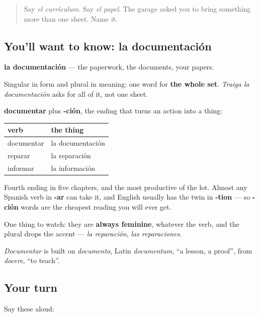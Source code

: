 \label{lesson:ES-C435-documentacion}



\begin{quote}
Say \emph{el currículum}. Say \emph{el papel}. The garage asked you to bring something more than one sheet. Name it.
\end{quote}

\subsection*{You'll want to know: la documentación}
\textbf{la documentación} — the paperwork, the documents, your papers.

Singular in form and plural in meaning: one word for \textbf{the whole set}. \emph{Traiga la documentación} asks for all of it, not one sheet.

\begin{cousinweb}
\textbf{documentar} plus \textbf{-ción}, the ending that turns an action into a thing:

\noindent
\begin{tabularx}{\linewidth}{@{}>{\raggedright\arraybackslash}X>{\raggedright\arraybackslash}X@{}}
\toprule
\textbf{verb} & \textbf{the thing} \\
\midrule
documentar & la documentación \\
reparar & la reparación \\
informar & la información \\
\bottomrule
\end{tabularx}

Fourth ending in five chapters, and the most productive of the lot. Almost any Spanish verb in \textbf{-ar} can take it, and English usually has the twin in \textbf{-tion} — so \textbf{-ción} words are the cheapest reading you will ever get.

One thing to watch: they are \textbf{always feminine}, whatever the verb, and the plural drops the accent — \emph{la reparación}, \emph{las reparaciones}.

\emph{Documentar} is built on \emph{documento}, Latin \emph{documentum}, \textquotedblleft{}a lesson, a proof\textquotedblright{}, from \emph{docere}, \textquotedblleft{}to teach\textquotedblright{}.
\end{cousinweb}

\subsection*{Your turn}
Say these aloud:

